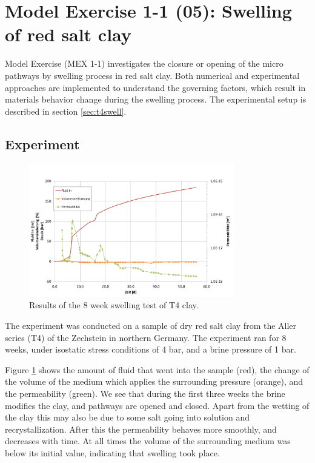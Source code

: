 \section{Model Exercise 1-1 (05): Swelling of red salt clay}
\label{sec:mex05}
Model Exercise (MEX 1-1) investigates the closure or opening of the micro pathways by swelling process in red salt clay. Both numerical and experimental approaches are implemented to understand the governing factors, which result in materials behavior change during the swelling process. The experimental setup is described in section \ref{sec:t4swell}.

\subsection{Experiment}

\begin{figure}[ht]
\centering
\includegraphics[width=0.8\textwidth]{figures/IfG-T4-results.png}
\caption{Results of the 8 week swelling test of T4 clay.}
\label{fig:t4swellresults}
\end{figure}

The experiment was conducted on a sample of dry red salt clay from the Aller series (T4) of the Zechstein in northern Germany. The experiment ran for 8 weeks, under isostatic stress conditions of 4 bar, and a brine pressure of 1 bar. 

Figure \ref{fig:t4swellresults} shows the amount of fluid that went into the sample (red), the change of the volume of the medium which applies the surrounding pressure (orange), and the permeability (green). We see that during the first three weeks the brine modifies the clay, and pathways are opened and closed. Apart from the wetting of the clay this may also be due to some salt going into solution and recrystallization. After this the permeability behaves more smoothly, and decreases with time. At all times the volume of the surrounding medium was below its initial value, indicating that swelling took place. 

